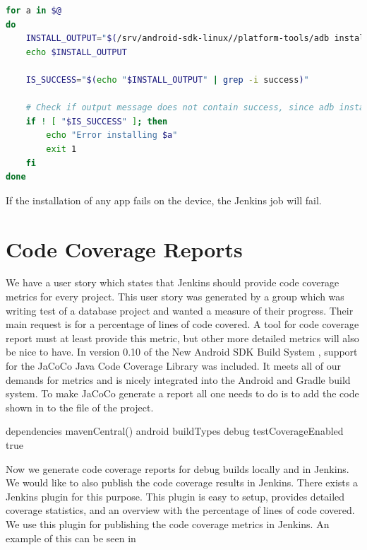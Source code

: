 \begin{lstlisting}[language=bash,showstringspaces=false,caption=Script that installs the given APKs to an Android device,label=lst:install_apks_on_android_device]
for a in $@
do
    INSTALL_OUTPUT="$(/srv/android-sdk-linux//platform-tools/adb install $a)"
    echo $INSTALL_OUTPUT

    IS_SUCCESS="$(echo "$INSTALL_OUTPUT" | grep -i success)"

    # Check if output message does not contain success, since adb install does not provide exit code != 0 at failure
    if ! [ "$IS_SUCCESS" ]; then
        echo "Error installing $a"
        exit 1
    fi
done
\end{lstlisting}

If the installation of any app fails on the device, the Jenkins job will fail.

\section{Code Coverage Reports}
We have a user story which states that Jenkins should provide code coverage metrics for every project. This user story was generated by a group which was writing test of a database project and wanted a measure of their progress. Their main request is for a percentage of lines of code covered. A tool for code coverage report must at least provide this metric, but other more detailed metrics will also be nice to have. In version 0.10 of the New Android SDK Build System \parencite{new-build-android}, support for the JaCoCo \parencite{jacoco-home} Java Code Coverage Library was included. It meets all of our demands for metrics and is nicely integrated into the Android and Gradle build system. To make JaCoCo generate a report all one needs to do is to add the code shown in  to the  file of the project.

\begin{gradlecode}[caption=Gradle script for enabling JaCoCo,label=lst:Jacoco]
dependencies {
    mavenCentral()
}
android {
    buildTypes {
        debug {
            testCoverageEnabled true
        }
    }
}
\end{gradlecode}{}

Now we generate code coverage reports for debug builds locally and in Jenkins. We would like to also publish the code coverage results in Jenkins. There exists a Jenkins plugin \parencite{jacoco-jenkins-plugin} for this purpose. This plugin is easy to setup, provides detailed coverage statistics, and an overview with the percentage of lines of code covered. We use this plugin for publishing the code coverage metrics in Jenkins. An example of this can be seen in 

